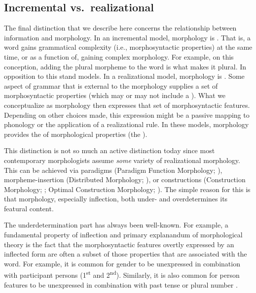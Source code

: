 \documentclass[output=paper,hidelinks]{langscibook}
\begin{document}
\subsection{Incremental vs.\ realizational}
\label{sec:Morph:incr-vs-real}


The final distinction that we describe here concerns the relationship
between information and morphology.  In an incremental model,
morphology is .  That is,
a word gains grammatical complexity (i.e., morphosyntactic properties)
at the same time, or as a function of, gaining complex morphology.
For example, on this conception, adding the plural morpheme to the word is what makes it
plural.  In opposition to this stand  models.  In
a realizational model, morphology is .
Some aspect of grammar that is external to the morphology supplies a
set of morphosyntactic properties (which may or may not include a
).  What we conceptualize as morphology then expresses
that set of morphosyntactic features. Depending on other choices made,
this expression might be a passive mapping to phonology or the
application of a realizational rule.  In these models, morphology
provides the  of morphological properties (the
).

This distinction is not so much an active distinction today since most
contemporary morphologists assume \emph{some} variety of realizational
morphology. This can be achieved via paradigms (Paradigm Function
Morphology; \citealt{Stu01,stump16,spencer13}), morpheme-insertion
(Distributed Morphology; \citealt{hallemarantz}), or constructions
(Construction Morphology; \citealt{Booij2010,masini;audring18};
Optimal Construction Morphology;
\citealt{inkelas;ea06,caballero;inkelas13,inkelas16}). The simple
reason for this is that morphology, especially inflection, both under-
and overdetermines its featural content.

The underdetermination part
has always been well-known.  For example, a fundamental property of
inflection and primary explanandum of morphological theory is the fact
that the morphosyntactic features overtly expressed by an inflected
form are often a subset of those properties that are associated with
the word.  For example, it is common for gender to be unexpressed in
combination with participant persons (1\textsuperscript{st} and
2\textsuperscript{nd}). Similarly, it is also common for person
features to be unexpressed in combination with past tense or plural
number \citep[see, for example,][]{bjorkman;ea21}. 
\end{document}
